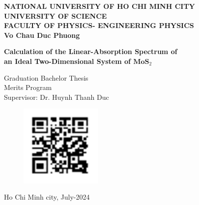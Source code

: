 \documentclass[12pt,english,a4paper]{article}
\begin{document}
	\begin{titlepage}
		\begin{center}
			{\large \textbf{NATIONAL UNIVERSITY OF HO CHI MINH CITY}\\\textbf{UNIVERSITY OF SCIENCE}\\}
			{ \textbf{FACULTY OF PHYSICS- ENGINEERING PHYSICS}}\\[2cm]
			
			
			{ \Large \bfseries Vo Chau Duc Phuong\\[2cm] } 
			
			
			{ \Large \bfseries Calculation of the Linear-Absorption Spectrum of\\ an Ideal Two-Dimensional System of $\mathrm{\textbf{MoS}}_2$\\[3cm]} 
			
			
			\large Graduation Bachelor Thesis\\
			\large Merits Program\\[2cm]
			
			Supervisor: Dr. Huynh Thanh Duc
			\begin{figure}[h]
				\centering
				\includegraphics[width=4cm]{images/qrgithub.pdf}
			\end{figure}\null
			\vfill
			Ho Chi Minh city, July-2024
		\end{center}
	\end{titlepage}
%			
\end{document}

